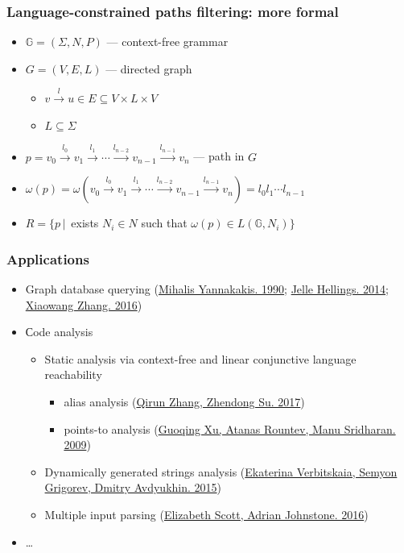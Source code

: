 \documentclass{beamer}
\begin{document}
\begin{frame}[fragile]
  \transwipe[direction=90]
  \frametitle{Language-constrained paths filtering: more formal}
  \begin{itemize}
    \item $\mathbb{G} = (\Sigma, N, P)$ --- context-free grammar
    \item $G = (V,E,L)$ --- directed graph
      \begin{itemize} 
        \item $v \xrightarrow{l} u \in E \subseteq V\times L \times V$
        \item $L\subseteq \Sigma$
      \end{itemize}
    \item $p = v_0 \xrightarrow{l_0} v_1 \xrightarrow{l_1} \cdots \xrightarrow{l_{n-2}} v_{n-1} \xrightarrow{l_{n-1}} v_n$ --- path in $G$
    \item $\omega(p) = \omega(v_0 \xrightarrow{l_0} v_1 \xrightarrow{l_1} \cdots \xrightarrow{l_{n-2}} v_{n-1} \xrightarrow{l_{n-1}} v_n) = l_0 l_1 \cdots l_{n-1}$
    \item $R = \{ p \,|\, $ exists $ N_i \in N $ such that $ \omega(p) \in L(\mathbb{G},N_i)\}$
  \end{itemize}
\end{frame}

\begin{frame}[fragile]
  \transwipe[direction=90]
  \frametitle{Applications}
  \begin{itemize}
    \item Graph database querying (\href{http://dl.acm.org/citation.cfm?id=298576}{Mihalis Yannakakis. 1990}; \href{https://uhdspace.uhasselt.be/dspace/handle/1942/16709}{Jelle Hellings. 2014}; \href{https://link.springer.com/chapter/10.1007/978-3-319-46523-4_38}{Xiaowang Zhang. 2016})
    \item Сode analysis
    \begin{itemize}
      \item Static analysis via context-free and linear conjunctive language reachability
        \begin{itemize}
          \item alias analysis (\href{https://dl.acm.org/citation.cfm?id=3009848}{Qirun Zhang, Zhendong Su. 2017})
          \item points-to analysis (\href{https://link.springer.com/chapter/10.1007/978-3-642-03013-0_6}{Guoqing Xu, Atanas Rountev, Manu Sridharan. 2009})
        \end{itemize}
      \item Dynamically generated strings analysis (\href{https://link.springer.com/chapter/10.1007/978-3-319-41579-6\_22}{Ekaterina Verbitskaia, Semyon Grigorev, Dmitry Avdyukhin. 2015})
      \item Multiple input parsing (\href{https://2016.splashcon.org/event/parsing2016-multiple-input-gll-parsing}{Elizabeth Scott, Adrian Johnstone. 2016})
    \end{itemize}
    \item \dots
  \end{itemize}
\end{frame}
\end{document}
